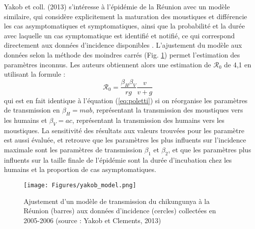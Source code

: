 Yakob et coll. (2013) s'intéresse à l'épidémie de la Réunion avec un modèle similaire, qui considère explicitement la maturation des moustiques et différencie les cas asymptomatiques et symptomatiques, ainsi que la probabilité et la durée avec laquelle un cas symptomatique est identifié et notifié, ce qui correspond directement aux données d'incidence disponibles \cite{yakob_mathematical_2013}. 
L'ajustement du modèle aux données selon la méthode des moindres carrés (Fig. \ref{fig:yakob}) permet l'estimation des paramètres inconnus.
Les auteurs obtiennent alors une estimation de $\mathcal{R}_0$ de 4,1 en utilisant la formule :
\begin{equation}
\mathcal{R}_0 = \frac{\beta_H \beta_V}{rg} \frac{v}{v+g}
\end{equation}
qui est en fait identique à l'équation (\ref{eq:poletti}) si on réorganise les paramètres de transmission en $\beta_H=mab$, représentant la transmission des moustiques vers les humains et $\beta_V=ac$, représentant la transmission des humains vers les moustiques.
La sensitivité des résultats aux valeurs trouvées pour les paramètre est aussi évaluée, et retrouve que les paramètres les plus influents sur l'incidence maximale sont les paramètres de transmission $\beta_1$ et $\beta_2$, et que les paramètres plus influents sur la taille finale de l'épidémie sont la durée d'incubation chez les humains et la proportion de cas asymptomatiques.

\begin{figure}[t]
	\centering
	\texttt{[image: Figures/yakob\_model.png]}
	\caption{Ajustement d'un modèle de transmission du chikungunya à la Réunion (barres) aux données d'incidence (cercles) collectées en 2005-2006 (source : Yakob et Clements, 2013)}
	\label{fig:yakob}
\end{figure}


